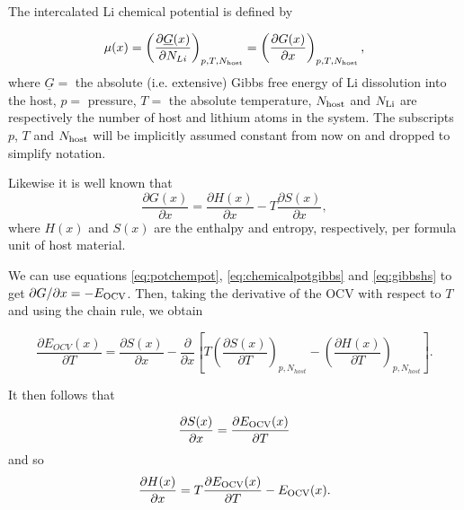 \documentclass[journal=jacsat,manuscript=article]{achemso}
\begin{document}
The intercalated Li chemical potential is defined by

\begin{equation}
    \mu(x) = \left(\frac{\partial{\underline{G}(x)}}{\partial{N_{Li}}}\right)_{p,T,N_{\rm{host}}} = \left(\frac{\partial{G(x)}}{\partial{x}}\right)_{p,T,N_{\rm{host}}},
    \label{eq:chemicalpotgibbs}
\end{equation}
where $\underline{G} =$ the absolute (i.e. extensive) Gibbs free energy of Li dissolution into the host, $p =$ pressure, $T =$ the absolute temperature, $N_{\rm{host}}$ and $N_{\rm{Li}}$ are respectively the number of host and lithium atoms in the system. The subscripts $p$, $T$ and $N_{\rm{host}}$ will be implicitly assumed constant from now on and dropped to simplify notation.

Likewise it is well known that
\begin{equation}
    \frac{\partial{G(x)}}{\partial{x}} = \frac{\partial{H(x)}}{\partial{x}} - T\frac{\partial{S(x)}}{\partial{x}}, 
    \label{eq:gibbshs}
\end{equation}
where $H(x)$ and $S(x)$ are the enthalpy and entropy, respectively, per formula unit of host material.

We can use equations \ref{eq:potchempot}, \ref{eq:chemicalpotgibbs} and \ref{eq:gibbshs} to get $\partial{G}/\partial{x} = -E_{\rm{OCV}}$. Then, taking the derivative of the OCV with respect to $T$ and using the chain rule, we obtain 

\begin{equation}
   \frac{\partial{E_{OCV}(x)}}{\partial{T}}
  = \frac{\partial{S(x)}}{\partial{x}} - \frac{\partial}{\partial{x}}\left[{T}\left(\frac{\partial{S(x)}}{\partial{T}}\right)_{p,N_{host}}-\left(\frac{\partial{H(x)}}{\partial{T}}\right)_{p,N_{host}}\right].  
   \label{eq:entropy_measurement_extra}
\end{equation}

It then follows that

\begin{equation}
   \frac{\partial{S(x)}}{\partial{x}} = \frac{\partial{E_{\rm{OCV}}(x)}}{\partial{T}}
    \label{eq:entropy_measurement}
\end{equation}
and so
\begin{equation}
    \frac{\partial{H(x)}}{\partial{x}} = T\frac{\partial{E_{\rm{OCV}}(x)}}{\partial{T}} - E_{\rm{OCV}}(x).
    \label{eq:enthalpy_measurement}
\end{equation}
\end{document}
